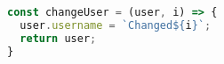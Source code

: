 \begin{lstlisting}[language=JavaScript,caption={K6 Change user function},breaklines=true,label={lst:k6ChangeUser}]
const changeUser = (user, i) => {
  user.username = `Changed${i}`;
  return user;
}
\end{lstlisting}
